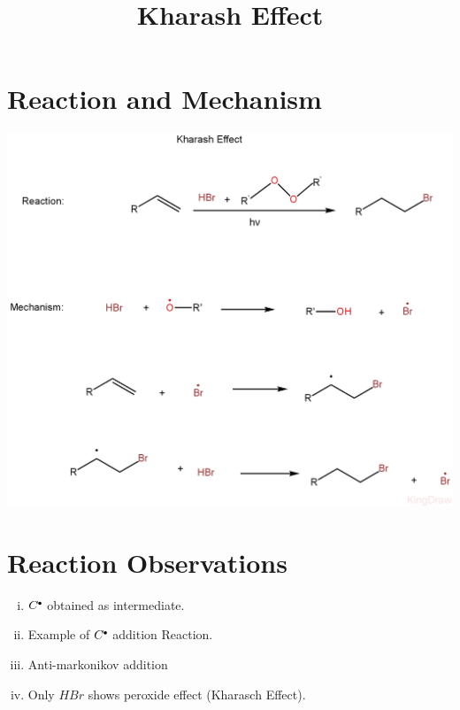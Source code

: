 \documentclass{article}
\title{Kharash Effect}
\author{}
\date{}
\newcommand*\fullcirc[1][0.3ex]{\tikz\fill (0,0) circle (#1);}
\begin{document}
\maketitle

\section{Reaction and Mechanism}
\includegraphics[scale=0.27]{KharaschEffect_1722410819316.JPEG}
\section{Reaction Observations}
\begin{enumerate}[i.]
    \item $C^{\fullcirc}$ obtained as intermediate.
    \item Example of $C^{\fullcirc}$ addition Reaction.
    \item Anti-markonikov addition
    \item Only $HBr$ shows peroxide effect (Kharasch Effect).
\end{enumerate}
\end{document}
